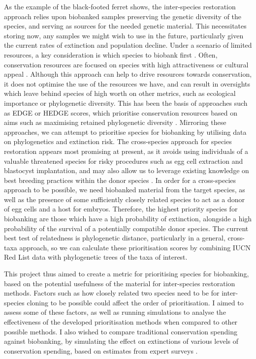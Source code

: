 \documentclass[10pt]{article}
\begin{document}
	As the example of the black-footed ferret shows, the inter-species restoration approach
	relies upon biobanked samples preserving the genetic diversity of the species, and
	serving as sources for the needed genetic material. This necessitates storing now,
	any samples we might wish to use in the future, particularly given the current
	rates of extinction and population decline. Under a scenario of limited resources,
	a key consideration is
	which species to biobank first \citep{harwoodDevelopingImplementingPrioritisation2021}.
	Often, conservation resources are focused on species with high attractiveness or
	cultural appeal \citep{gunnthorsdottirPhysicalAttractivenessAnimal2001}. Although this approach can help to drive resources
	towards conservation, it does not optimise the use of the resources we have, 
	and can result in oversights which leave behind species of high worth on other
	metrics, such as ecological importance or phylogenetic diversity. This has been
	the basis of approaches such as EDGE or HEDGE scores, which prioritise conservation 
	resources based on aims such as maximising retained phylogenetic diversity \citep{isaacMammalsEDGEConservation2007,steelHedgingOurBets2007}.
	Mirroring these approaches, we can attempt to prioritise species for biobanking
	by utilising data on phylogenetics and extinction risk.
	The cross-species approach for species restoration appears most promising at present, as it avoids using
	individuals of a valuable threatened species for risky procedures such as egg cell
	extraction and blastocyst implantation, and may also allow us to leverage existing
	knowledge on best breeding practices within the donor species \citep{wiselyRoadMap21st2015}. In order for a
	cross-species approach to be possible, we need biobanked material from the target
	species, as well as the presence of some sufficiently closely related species to act
	as a donor of egg cells and a host for embryos. Therefore, the highest priority species
	for biobanking are those which have a high probability of extinction, alongside a high
	probability of the survival of a potentially compatible donor species. The current best test of
	relatedness is phylogenetic distance, particularly in a general, cross-taxa approach, so we can calculate these prioritisation
	scores by combining IUCN Red List data with phylogenetic trees of the taxa of 
	interest.
	
	This project thus aimed to create a metric for prioritising species for
	biobanking, based on the potential usefulness of the material for inter-species
	restoration methods. Factors such as how closely related two species need to
	be for inter-species cloning to be possible could affect the order of
	prioritisation. I aimed to assess some of these factors, as well as running
	simulations to analyse the effectiveness of the developed prioritisation
	methods when compared to other possible methods. I also wished to compare
	traditional conservation spending against biobanking, by simulating the
	effect on extinctions of various levels of conservation spending, based on
	estimates from expert surveys
	\citep{mccarthyFinancialCostsMeeting2012,nunesPriceConservingAvian2015}.
\end{document}
